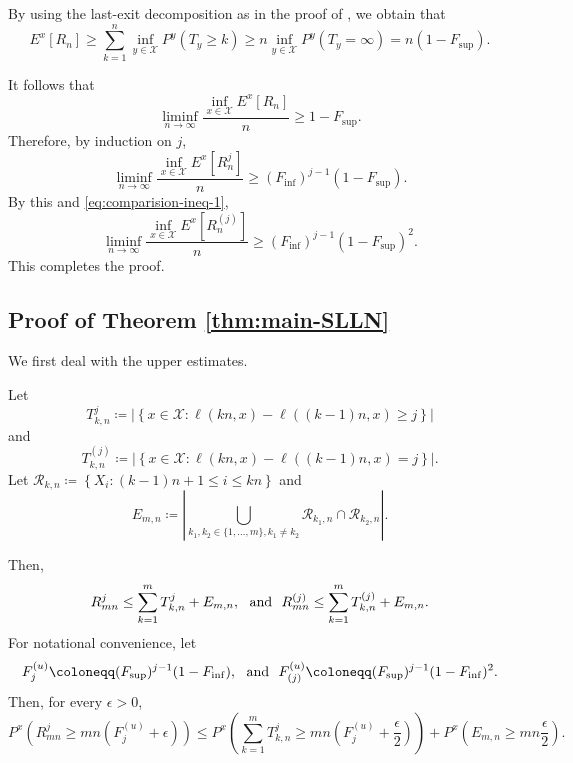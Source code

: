 \documentclass[a4paper, reqno, 11pt]{amsart}
\theoremstyle{definition}
\begin{document}
By using the last-exit decomposition as in the proof of  \cite[Theorem 1.2]{Okamura2014}, 
we obtain that
\begin{equation}\label{eq:exp-lower-most-basic} 
E^{x} \left[R_n \right] \ge \sum_{k=1}^{n} \inf_{y \in \mathcal{X}} P^y (T_y \ge k) \ge n \inf_{y \in \mathcal{X}} P^y (T_y = \infty) = n(1 - F_{\sup}). 
\end{equation}

It follows that 
\[ \liminf_{n \to \infty} \frac{\inf_{x \in \mathcal{X}} E^{x} \left[R_n \right]}{n} \ge 1 - F_{\sup}. \]
Therefore, by induction on $j$, 
\begin{equation*}\label{eq:lower-exp-1} 
\liminf_{n \to \infty} \frac{\inf_{x \in \mathcal{X}} E^{x} \left[R_n^j \right]}{n} \ge (F_{\inf})^{j-1} (1 - F_{\sup}). 
\end{equation*}
By this and \eqref{eq:comparision-ineq-1}, 
\[ \liminf_{n \to \infty} \frac{\inf_{x \in \mathcal{X}} E^{x} \left[R_n^{(j)} \right]}{n} \ge (F_{\inf})^{j-1} (1 - F_{\sup})^2. \]
This completes the proof. 

\subsection{Proof of Theorem \ref{thm:main-SLLN}}


We first deal with the upper estimates. 

Let 
\[ T^{j}_{k,n} \coloneqq \left|\left\{x \in \mathcal{X} \colon \ell(kn,x) - \ell((k-1)n,x) \ge  j \right\}\right|  \]
and 
\[ T^{(j)}_{k,n} \coloneqq \left|\left\{x \in \mathcal{X} \colon  \ell(kn,x) - \ell((k-1)n,x) =  j \right\}\right|.  \]
Let 
$\mathcal{R}_{k,n} \coloneqq \left\{X_{i} \colon (k-1)n + 1 \le i \le kn \right\}$  
and  
\begin{equation}\label{eq:Emn} 
E_{m,n} \coloneqq \left|\bigcup_{k_1, k_2 \in \{1, \dots, m\}, k_1 \ne k_2} \mathcal{R}_{k_1, n} \cap \mathcal{R}_{k_2, n} \right|. 
\end{equation}

Then, 
\[ R_{mn}^{j} \le \sum_{k=1}^{m}   T^{j}_{k,n} + E_{m,n}, \ \textup{ and }  \  R_{mn}^{(j)} \le \sum_{k=1}^{m}   T^{(j)}_{k,n} + E_{m,n}. \]
For notational convenience, let 
\[ F^{(u)}_{j} \coloneqq (F_{\sup})^{j-1} (1-F_{\inf}), \ \textup{ and }  \ F^{(u)}_{(j)} \coloneqq (F_{\sup})^{j-1} (1-F_{\inf})^2. \]
Then, for every $\epsilon > 0$, 
\[ P^x \left(R_{mn}^{j} \ge mn(F_j^{(u)} + \epsilon)\right) \le P^x \left(  \sum_{k=1}^{m}   T^{j}_{k,n} \ge mn \left(F_j^{(u)} + \frac{\epsilon}{2} \right) \right) + P^x \left( E_{m,n} \ge mn \frac{\epsilon}{2} \right). \]
\end{document}
